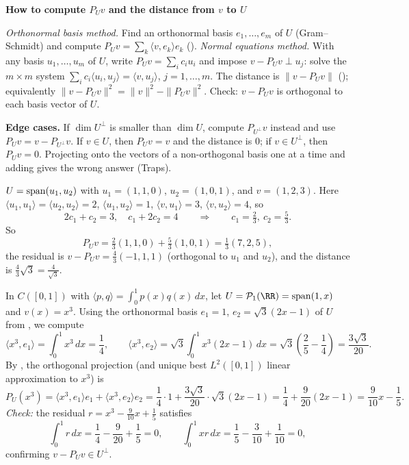 \documentclass[10pt]{scrartcl}
\newcommand{\ip}[2]{\langle #1,#2\rangle}
\newenvironment{methodbox}[1]{\begin{mdframed}[style=mdbluebox,linecolor=NavyBlue,backgroundcolor=NavyBlue!3]\textbf{\color{NavyBlue}#1}\par\vspace{2pt}}{\end{mdframed}}
\begin{document}
\begin{methodbox}{How to compute $P_Uv$ and the distance from $v$ to $U$}
\begin{enumerate}[label=\arabic*.,leftmargin=1.5em,itemsep=2pt,topsep=2pt]
  \ii \emph{Orthonormal basis method.} Find an orthonormal basis $e_1,\dots,e_m$ of $U$ (Gram--Schmidt) and compute $P_Uv=\sum_k\ip v{e_k}e_k$ ().
  \ii \emph{Normal equations method.} With any basis $u_1,\dots,u_m$ of $U$, write $P_Uv=\sum_ic_iu_i$ and impose $v-P_Uv\perp u_j$: solve the $m\times m$ system $\sum_ic_i\ip{u_i}{u_j}=\ip v{u_j}$, $j=1,\dots,m$.
  \ii The distance is $\|v-P_Uv\|$ (); equivalently $\|v-P_Uv\|^2=\|v\|^2-\|P_Uv\|^2$.
  \ii Check: $v-P_Uv$ is orthogonal to each basis vector of $U$.
\end{enumerate}
\textbf{Edge cases.} If $\dim U^\perp$ is smaller than $\dim U$, compute $P_{U^\perp}v$ instead and use $P_Uv=v-P_{U^\perp}v$. If $v\in U$, then $P_Uv=v$ and the distance is $0$; if $v\in U^\perp$, then $P_Uv=0$. Projecting onto the vectors of a non-orthogonal basis one at a time and adding gives the wrong answer (Traps).
\end{methodbox}

\begin{example*}
  $U=\operatorname{span}(u_1,u_2)$ with $u_1=(1,1,0)$, $u_2=(1,0,1)$, and $v=(1,2,3)$. Here $\ip{u_1}{u_1}=\ip{u_2}{u_2}=2$, $\ip{u_1}{u_2}=1$, $\ip v{u_1}=3$, $\ip v{u_2}=4$, so
  \[ 2c_1+c_2=3,\quad c_1+2c_2=4\qquad\Longrightarrow\qquad c_1=\tfrac23,\ c_2=\tfrac53. \]
  So
  \[ P_Uv=\tfrac23(1,1,0)+\tfrac53(1,0,1)=\tfrac13(7,2,5), \]
  the residual is $v-P_Uv=\frac43(-1,1,1)$ (orthogonal to $u_1$ and $u_2$), and the distance is $\frac43\sqrt3=\frac4{\sqrt3}$.
\end{example*}

\begin{example*}
  In $C([0,1])$ with $\ip pq=\int_0^1 p(x)q(x)\,dx$, let $U=\PP_1(\RR)=\spn(1,x)$ and $v(x)=x^3$. Using the orthonormal basis $e_1=1$, $e_2=\sqrt{3}(2x-1)$ of $U$ from , we compute
  \[
    \ip{x^3}{e_1} = \int_0^1 x^3\,dx = \frac{1}{4}, \qquad \ip{x^3}{e_2} = \sqrt{3}\int_0^1 x^3(2x-1)\,dx = \sqrt{3}\left(\frac{2}{5}-\frac{1}{4}\right) = \frac{3\sqrt 3}{20}.
  \]
  By , the orthogonal projection (and unique best $L^2([0,1])$ linear approximation to $x^3$) is
  \[
    P_U(x^3) = \ip{x^3}{e_1}e_1 + \ip{x^3}{e_2}e_2 = \frac{1}{4}\cdot 1 + \frac{3\sqrt 3}{20}\cdot\sqrt{3}(2x-1) = \frac{1}{4} + \frac{9}{20}(2x-1) = \frac{9}{10}x - \frac{1}{5}.
  \]
  \emph{Check:} the residual $r=x^3-\frac{9}{10}x+\frac{1}{5}$ satisfies
  \[ \int_0^1r\,dx=\frac14-\frac9{20}+\frac15=0,\qquad\int_0^1xr\,dx=\frac15-\frac3{10}+\frac1{10}=0, \]
  confirming $v-P_U v\in U^\perp$.
\end{example*}
\end{document}
